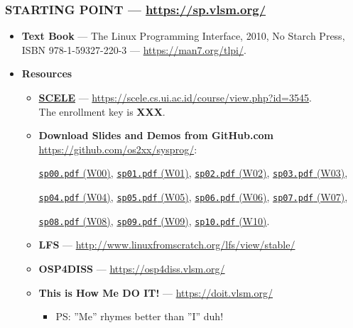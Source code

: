 \begin{frame}[fragile]
\frametitle{\textbf{STARTING POINT} --- 
{
\hypersetup{colorlinks,linkcolor=,urlcolor=links}
\url{https://sp.vlsm.org/}
}
}
\begin{itemize}
\item[$\square$] \textbf{Text Book} ---
The Linux Programming Interface, 2010, No Starch Press, 
ISBN 978-1-59327-220-3 --- \url{https://man7.org/tlpi/}. 
\item[$\square$] \textbf{Resources}
\begin{itemize}
\item[$\square$] \href{https://scele.cs.ui.ac.id/course/view.php?id=3545}{\textbf{SCELE}} ---
\url{https://scele.cs.ui.ac.id/course/view.php?id=3545}.\\
The enrollment key is \textbf{XXX}.
\item[$\square$] \textbf{Download Slides and Demos from GitHub.com} \\
\url{https://github.com/os2xx/sysprog/}:

                 {\scriptsize%
                 \href{https://sp.vlsm.org/Slides/sp00.pdf}{\texttt{sp00.pdf} (W00)},
                 \href{https://sp.vlsm.org/Slides/sp01.pdf}{\texttt{sp01.pdf} (W01)},
                 \href{https://sp.vlsm.org/Slides/sp02.pdf}{\texttt{sp02.pdf} (W02)},
                 \href{https://sp.vlsm.org/Slides/sp03.pdf}{\texttt{sp03.pdf} (W03)},

                 \href{https://sp.vlsm.org/Slides/sp04.pdf}{\texttt{sp04.pdf} (W04)},
                 \href{https://sp.vlsm.org/Slides/sp05.pdf}{\texttt{sp05.pdf} (W05)},
                 \href{https://sp.vlsm.org/Slides/sp06.pdf}{\texttt{sp06.pdf} (W06)},
                 \href{https://sp.vlsm.org/Slides/sp07.pdf}{\texttt{sp07.pdf} (W07)},

                 \href{https://sp.vlsm.org/Slides/sp08.pdf}{\texttt{sp08.pdf} (W08)},
                 \href{https://sp.vlsm.org/Slides/sp09.pdf}{\texttt{sp09.pdf} (W09)},
                 \href{https://sp.vlsm.org/Slides/sp10.pdf}{\texttt{sp10.pdf} (W10)}.
                 }
\item[$\square$] \textbf{LFS} --- \url{http://www.linuxfromscratch.org/lfs/view/stable/}
\item[$\square$] \textbf{OSP4DISS} --- \url{https://osp4diss.vlsm.org/}
\item[$\square$] \textbf{This is How Me DO IT!} --- \url{https://doit.vlsm.org/}
\begin{itemize}
\item[$\square$] PS: ''Me'' rhymes better than ''I'' duh!
\end{itemize}
\end{itemize}
\end{itemize}
\end{frame}

